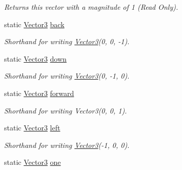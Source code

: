 \begin{DoxyCompactItemize}
\begin{DoxyCompactList}\small\item\em Returns this vector with a magnitude of 1 (Read Only). \end{DoxyCompactList}\item 
static \mbox{\hyperlink{class_lua_1_1_vector3}{Vector3}} \mbox{\hyperlink{class_lua_1_1_vector3_a3742b113252e0163b006a17a76cb558c}{back}}
\begin{DoxyCompactList}\small\item\em Shorthand for writing \mbox{\hyperlink{class_lua_1_1_vector3}{Vector3}}(0, 0, -\/1). \end{DoxyCompactList}\item 
static \mbox{\hyperlink{class_lua_1_1_vector3}{Vector3}} \mbox{\hyperlink{class_lua_1_1_vector3_adfb20fbfe1e5224b0b0fade3da0d4c8f}{down}}
\begin{DoxyCompactList}\small\item\em Shorthand for writing \mbox{\hyperlink{class_lua_1_1_vector3}{Vector3}}(0, -\/1, 0). \end{DoxyCompactList}\item 
static \mbox{\hyperlink{class_lua_1_1_vector3}{Vector3}} \mbox{\hyperlink{class_lua_1_1_vector3_ad8be15240d9bfa336d926ab023f11ad4}{forward}}
\begin{DoxyCompactList}\small\item\em Shorthand for writing Vector3(0, 0, 1). \end{DoxyCompactList}\item 
static \mbox{\hyperlink{class_lua_1_1_vector3}{Vector3}} \mbox{\hyperlink{class_lua_1_1_vector3_a5a08c13ed00efb9fb6728fded1e8a472}{left}}
\begin{DoxyCompactList}\small\item\em Shorthand for writing \mbox{\hyperlink{class_lua_1_1_vector3}{Vector3}}(-\/1, 0, 0). \end{DoxyCompactList}\item 
static \mbox{\hyperlink{class_lua_1_1_vector3}{Vector3}} \mbox{\hyperlink{class_lua_1_1_vector3_a16592c4087c4d02cf1dd00a06d5baced}{one}}

\end{DoxyCompactItemize}
